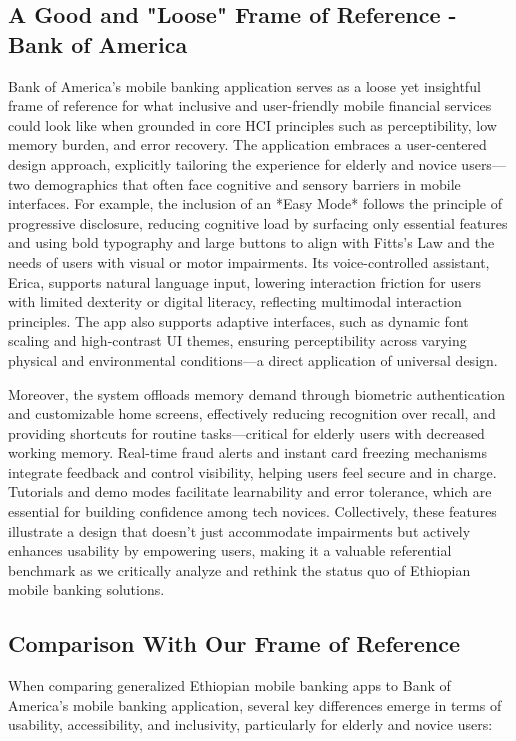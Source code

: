 \documentclass[a4paper,12pt]{report}
\begin{document}
\subsection{A Good and "Loose" Frame of Reference - Bank of America}
Bank of America's mobile banking application serves as a loose yet insightful frame of reference for what inclusive and user-friendly mobile financial services could look like when grounded in core HCI principles such as perceptibility, low memory burden, and error recovery. The application embraces a user-centered design approach, explicitly tailoring the experience for elderly and novice users—two demographics that often face cognitive and sensory barriers in mobile interfaces. For example, the inclusion of an *Easy Mode* follows the principle of progressive disclosure, reducing cognitive load by surfacing only essential features and using bold typography and large buttons to align with Fitts’s Law and the needs of users with visual or motor impairments. Its voice-controlled assistant, Erica, supports natural language input, lowering interaction friction for users with limited dexterity or digital literacy, reflecting multimodal interaction principles. The app also supports adaptive interfaces, such as dynamic font scaling and high-contrast UI themes, ensuring perceptibility across varying physical and environmental conditions—a direct application of universal design.

Moreover, the system offloads memory demand through biometric authentication and customizable home screens, effectively reducing recognition over recall, and providing shortcuts for routine tasks—critical for elderly users with decreased working memory. Real-time fraud alerts and instant card freezing mechanisms integrate feedback and control visibility, helping users feel secure and in charge. Tutorials and demo modes facilitate learnability and error tolerance, which are essential for building confidence among tech novices. Collectively, these features illustrate a design that doesn’t just accommodate impairments but actively enhances usability by empowering users, making it a valuable referential benchmark as we critically analyze and rethink the status quo of Ethiopian mobile banking solutions.

\subsection{Comparison With Our Frame of Reference}

When comparing generalized Ethiopian mobile banking apps to Bank of America’s mobile banking application, several key differences emerge in terms of usability, accessibility, and inclusivity, particularly for elderly and novice users:
\end{document}
